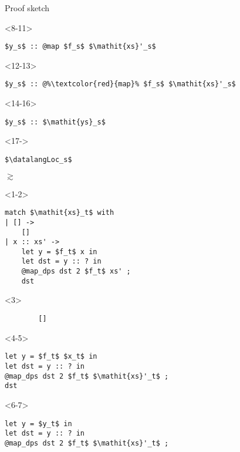 \begin{frame}[fragile]{Proof sketch}
\begin{minipage}{.4\columnwidth}
    \begin{onlyenv}<8-11>
        \begin{lstlisting}
$y_s$ :: @map $f_s$ $\mathit{xs}'_s$
        \end{lstlisting}
    \end{onlyenv}
    \begin{onlyenv}<12-13>
        \begin{lstlisting}
$y_s$ :: @%\textcolor{red}{map}% $f_s$ $\mathit{xs}'_s$
        \end{lstlisting}
    \end{onlyenv}
    \begin{onlyenv}<14-16>
        \begin{lstlisting}
$y_s$ :: $\mathit{ys}_s$
        \end{lstlisting}
    \end{onlyenv}
    \begin{onlyenv}<17->
        \begin{lstlisting}
$\datalangLoc_s$
        \end{lstlisting}
    \end{onlyenv}
\end{minipage}
\begin{minipage}{.05\columnwidth}
$\gtrsim$
\end{minipage}
\begin{minipage}{.4\columnwidth}
    \begin{onlyenv}<1-2>
        \begin{lstlisting}
match $\mathit{xs}_t$ with
| [] ->
    []
| x :: xs' ->
    let y = $f_t$ x in
    let dst = y :: ? in
    @map_dps dst 2 $f_t$ xs' ;
    dst
        \end{lstlisting}
    \end{onlyenv}
    \begin{onlyenv}<3>
        \begin{lstlisting}
        []
        \end{lstlisting}
    \end{onlyenv}
    \begin{onlyenv}<4-5>
        \begin{lstlisting}
let y = $f_t$ $x_t$ in
let dst = y :: ? in
@map_dps dst 2 $f_t$ $\mathit{xs}'_t$ ;
dst
        \end{lstlisting}
    \end{onlyenv}
    \begin{onlyenv}<6-7>
        \begin{lstlisting}
let y = $y_t$ in
let dst = y :: ? in
@map_dps dst 2 $f_t$ $\mathit{xs}'_t$ ;

\end{lstlisting}
\end{onlyenv}
\end{minipage}
\end{frame}

